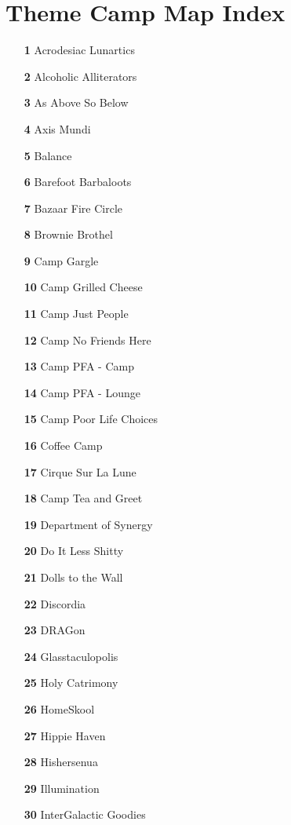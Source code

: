 \section*{Theme Camp Map Index}
\begin{itemize}[itemsep=.0125mm,parsep=2pt]
	\item[\textbf{ 1 }] Acrodesiac Lunartics
	\item[\textbf{ 2 }] Alcoholic Alliterators
	\item[\textbf{ 3 }] As Above So Below
	\item[\textbf{ 4 }] Axis Mundi
	\item[\textbf{ 5 }] Balance
	\item[\textbf{ 6 }] Barefoot Barbaloots
	\item[\textbf{ 7 }] Bazaar Fire Circle
	\item[\textbf{ 8 }] Brownie Brothel
	\item[\textbf{ 9 }] Camp Gargle
	\item[\textbf{ 10 }] Camp Grilled Cheese
	\item[\textbf{ 11 }] Camp Just People
	\item[\textbf{ 12 }] Camp No Friends Here
	\item[\textbf{ 13 }] Camp PFA - Camp
	\item[\textbf{ 14 }] Camp PFA - Lounge
	\item[\textbf{ 15 }] Camp Poor Life Choices
	\item[\textbf{ 16 }] Coffee Camp
	\item[\textbf{ 17 }] Cirque Sur La Lune
	\item[\textbf{ 18 }] Camp Tea and Greet
	\item[\textbf{ 19 }] Department of Synergy
	\item[\textbf{ 20 }] Do It Less Shitty
	\item[\textbf{ 21 }] Dolls to the Wall
	\item[\textbf{ 22 }] Discordia
	\item[\textbf{ 23 }] DRAGon
	\item[\textbf{ 24 }] Glasstaculopolis
	\item[\textbf{ 25 }] Holy Catrimony
	\item[\textbf{ 26 }] HomeSkool
	\item[\textbf{ 27 }] Hippie Haven
	\item[\textbf{ 28 }] Hishersenua
	\item[\textbf{ 29 }] Illumination
	\item[\textbf{ 30 }] InterGalactic Goodies

\end{itemize}
